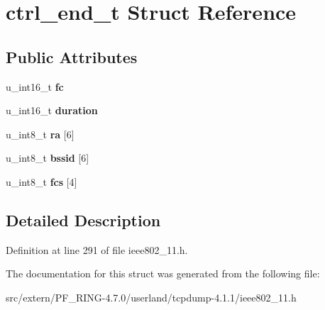 \hypertarget{structctrl__end__t}{
\section{ctrl\_\-end\_\-t Struct Reference}
\label{structctrl__end__t}
}
\subsection*{Public Attributes}
\begin{DoxyCompactItemize}
\item 
\hypertarget{structctrl__end__t_aa2b8bd8d8dcfb383697ea655bbfb2699}{
u\_\-int16\_\-t {\bfseries fc}}
\label{structctrl__end__t_aa2b8bd8d8dcfb383697ea655bbfb2699}

\item 
\hypertarget{structctrl__end__t_abc16969375763d0edfb5362d8804b006}{
u\_\-int16\_\-t {\bfseries duration}}
\label{structctrl__end__t_abc16969375763d0edfb5362d8804b006}

\item 
\hypertarget{structctrl__end__t_a9f2e62ba58dd5714dc00439f2848e913}{
u\_\-int8\_\-t {\bfseries ra} \mbox{[}6\mbox{]}}
\label{structctrl__end__t_a9f2e62ba58dd5714dc00439f2848e913}

\item 
\hypertarget{structctrl__end__t_a3b8f58d6ceb79b15c794dfceab1e6a91}{
u\_\-int8\_\-t {\bfseries bssid} \mbox{[}6\mbox{]}}
\label{structctrl__end__t_a3b8f58d6ceb79b15c794dfceab1e6a91}

\item 
\hypertarget{structctrl__end__t_af34537592ef64cd8b4c22afc6c6818f6}{
u\_\-int8\_\-t {\bfseries fcs} \mbox{[}4\mbox{]}}
\label{structctrl__end__t_af34537592ef64cd8b4c22afc6c6818f6}

\end{DoxyCompactItemize}


\subsection{Detailed Description}


Definition at line 291 of file ieee802\_\-11.h.



The documentation for this struct was generated from the following file:\begin{DoxyCompactItemize}
\item 
src/extern/PF\_\-RING-\/4.7.0/userland/tcpdump-\/4.1.1/ieee802\_\-11.h\end{DoxyCompactItemize}
